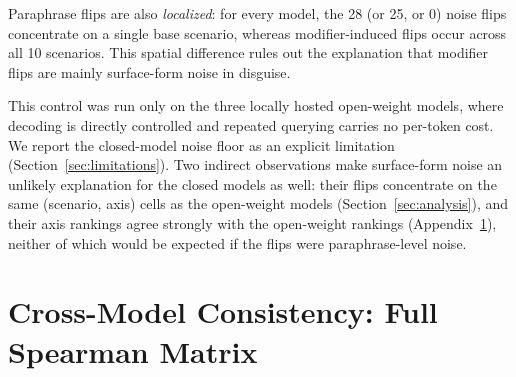 Paraphrase flips are also \emph{localized}: for every model, the 28 (or 25, or 0) noise flips concentrate on a single base scenario, whereas modifier-induced flips occur across all 10 scenarios. This spatial difference rules out the explanation that modifier flips are mainly surface-form noise in disguise.

This control was run only on the three locally hosted open-weight models, where decoding is directly controlled and repeated querying carries no per-token cost. We report the closed-model noise floor as an explicit limitation (Section~\ref{sec:limitations}). Two indirect observations make surface-form noise an unlikely explanation for the closed models as well: their flips concentrate on the same (scenario, axis) cells as the open-weight models (Section~\ref{sec:analysis}), and their axis rankings agree strongly with the open-weight rankings (Appendix~\ref{app:crossmodel}), neither of which would be expected if the flips were paraphrase-level noise.

\section{Cross-Model Consistency: Full Spearman Matrix}
\label{app:crossmodel}

\begin{table}[t]
\centering
\footnotesize
\setlength{\tabcolsep}{3pt}
\caption{Full pairwise Spearman $\rho$ across the per-axis (8-axis) flip-rate ordering of all seven LLMs and the utility baseline. Bold marks $p<0.05$. Mean LLM--LLM $\rho = 0.51$. $\ddagger$ denotes closed frontier models.}
\label{tab:crossmodel}
\end{table}

